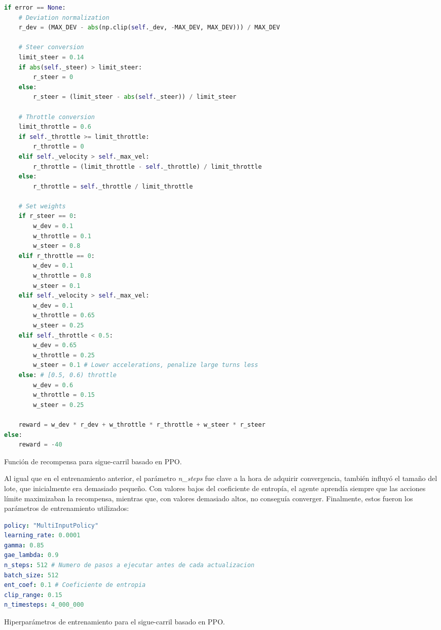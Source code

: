 \begin{code}[H]
\begin{lstlisting}[language=Python]
if error == None:
    # Deviation normalization
    r_dev = (MAX_DEV - abs(np.clip(self._dev, -MAX_DEV, MAX_DEV))) / MAX_DEV
    
    # Steer conversion
    limit_steer = 0.14
    if abs(self._steer) > limit_steer:
        r_steer = 0
    else:
        r_steer = (limit_steer - abs(self._steer)) / limit_steer

    # Throttle conversion
    limit_throttle = 0.6
    if self._throttle >= limit_throttle:
        r_throttle = 0
    elif self._velocity > self._max_vel:
        r_throttle = (limit_throttle - self._throttle) / limit_throttle
    else:
        r_throttle = self._throttle / limit_throttle

    # Set weights
    if r_steer == 0:
        w_dev = 0.1
        w_throttle = 0.1
        w_steer = 0.8
    elif r_throttle == 0:
        w_dev = 0.1
        w_throttle = 0.8
        w_steer = 0.1
    elif self._velocity > self._max_vel:
        w_dev = 0.1
        w_throttle = 0.65
        w_steer = 0.25
    elif self._throttle < 0.5:
        w_dev = 0.65
        w_throttle = 0.25
        w_steer = 0.1 # Lower accelerations, penalize large turns less
    else: # [0.5, 0.6) throttle
        w_dev = 0.6
        w_throttle = 0.15
        w_steer = 0.25

    reward = w_dev * r_dev + w_throttle * r_throttle + w_steer * r_steer
else:
    reward = -40

\end{lstlisting}
\caption[Función de recompensa para sigue-carril basado en \ac{PPO}]{Función de recompensa para sigue-carril basado en \ac{PPO}.}
\label{cod:rew_ppo}
\end{code}

Al igual que en el entrenamiento anterior, el parámetro \textit{n\_steps} fue clave a la hora de adquirir convergencia, también influyó el tamaño del lote, que inicialmente era demasiado pequeño. Con valores bajos del coeficiente de entropía, el agente aprendía siempre que las acciones límite maximizaban la recompensa, mientras que, con valores demasiado altos, no conseguía converger. Finalmente, estos fueron los parámetros de entrenamiento utilizados:
\begin{code}[h]
\begin{lstlisting}[language=yaml]
policy: "MultiInputPolicy"
learning_rate: 0.0001
gamma: 0.85
gae_lambda: 0.9
n_steps: 512 # Numero de pasos a ejecutar antes de cada actualizacion
batch_size: 512 
ent_coef: 0.1 # Coeficiente de entropia
clip_range: 0.15 
n_timesteps: 4_000_000

\end{lstlisting}
\caption[Hiperparámetros de entrenamiento para el sigue-carril basado en \ac{PPO}]{Hiperparámetros de entrenamiento para el sigue-carril basado en \ac{PPO}.}
\label{cod:hiper_params_ppo}
\end{code}

